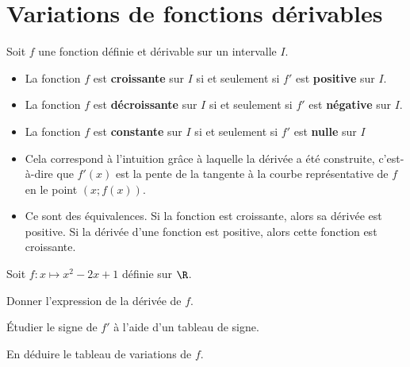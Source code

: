 \documentclass{article}
\begin{document}
\section{Variations de fonctions dérivables}
\begin{tcolorbox}
\begin{proposition}
Soit $f$ une fonction définie et dérivable sur un intervalle $I$.
\begin{itemize}
\item La fonction $f$ est \textbf{croissante} sur $I$ si et seulement si $f'$ est \textbf{positive} sur $I$.
\item La fonction $f$ est \textbf{décroissante} sur $I$ si et seulement si $f'$ est \textbf{négative} sur $I$.
\item La fonction $f$ est \textbf{constante} sur $I$ si et seulement si $f'$ est \textbf{nulle} sur $I$  
\end{itemize}        
\end{proposition}
\end{tcolorbox}
\begin{remark}
\begin{itemize}
\item Cela correspond à l'intuition grâce à laquelle la dérivée a été construite, c'est-à-dire que $f'(x)$ est la pente de la tangente à la courbe représentative de $f$ en le point $(x;f(x))$.
\item Ce sont des équivalences. Si la fonction est croissante, alors sa dérivée est positive. Si la dérivée d'une fonction est positive, alors cette fonction est croissante.
\end{itemize}
\end{remark}
\begin{example}
Soit $f : x \mapsto x^2 - 2x + 1$ définie sur $\R$.
\begin{enumquestions}
\item Donner l'expression de la dérivée de $f$. \answersline
\item Étudier le signe de $f'$ à l'aide d'un tableau de signe.
\begin{center}
\end{center}
\item En déduire le tableau de variations de $f$.
\begin{center}
\end{center}
\end{enumquestions}
\end{example}
\newpage
\end{document}

